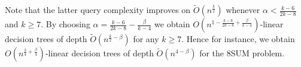 Note that the latter query complexity improves on $\tilde{O}(n^{\frac{k}{2}})$
whenever \(\alpha < \frac{k-6}{2k-8}\) and $k\ge 7$.
By choosing $\alpha=\frac{k-6}{2k-8}-\frac{\beta}{k-4}$
we obtain $O(n^{1-\frac{k-6}{2k-8}+\frac{\beta}{k-4}})$-linear decision trees
of depth
$\tilde{O}(n^{\frac k2 - \beta})$
for any $k \ge 7$.
Hence for instance, we obtain
$O(n^{\frac{3}{4}+\frac{\beta}{4}})$-linear decision trees of depth
$\tilde{O}(n^{4-\beta})$ for the 8SUM problem.

